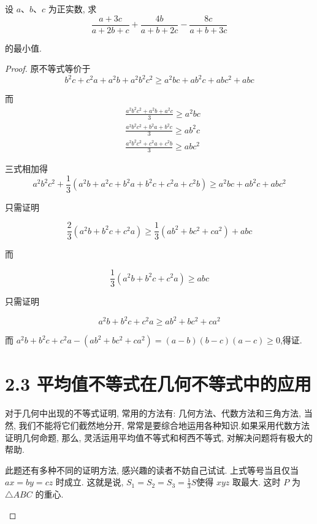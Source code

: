 \begin{example}
	设 $a 、 b 、 c$ 为正实数, 求
	$$
	\frac{a+3 c}{a+2 b+c}+\frac{4 b}{a+b+2 c}-\frac{8 c}{a+b+3 c}
	$$
	
	的最小值.
\end{example}
\begin{proof}
	原不等式等价于
	$$
	b^{2} c+c^{2} a+a^{2} b+a^{2} b^{2} c^{2} \geqslant a^{2} b c+a b^{2} c+a b c^{2}+a b c
	$$
	
	而
	$$
	\begin{aligned}
	& \frac{a^{2} b^{2} c^{2}+a^{2} b+a^{2} c}{3} \geqslant a^{2} b c \\
	& \frac{a^{2} b^{2} c^{2}+b^{2} a+b^{2} c}{3} \geqslant a b^{2} c \\
	& \frac{a^{2} b^{2} c^{2}+c^{2} a+c^{2} b}{3} \geqslant a b c^{2}
	\end{aligned}
	$$
	
	三式相加得
	$$
	a^{2} b^{2} c^{2}+\frac{1}{3}\left(a^{2} b+a^{2} c+b^{2} a+b^{2} c+c^{2} a+c^{2} b\right) \geqslant a^{2} b c+a b^{2} c+a b c^{2}
	$$
	
	只需证明
	
	$$
	\frac{2}{3}\left(a^{2} b+b^{2} c+c^{2} a\right) \geqslant \frac{1}{3}\left(a b^{2}+b c^{2}+c a^{2}\right)+a b c
	$$
	
	而
	
	$$
	\frac{1}{3}\left(a^{2} b+b^{2} c+c^{2} a\right) \geqslant a b c
	$$
	
	只需证明
	
	$$
	a^{2} b+b^{2} c+c^{2} a \geqslant a b^{2}+b c^{2}+c a^{2}
	$$
	
	而 $a^{2} b+b^{2} c+c^{2} a-\left(a b^{2}+b c^{2}+c a^{2}\right)=(a-b)(b-c)(a-c) \geqslant 0$,得证.
	

	\section*{2.3 平均值不等式在几何不等式中的应用}
	对于几何中出现的不等式证明, 常用的方法有: 几何方法、代数方法和三角方法, 当然, 我们不能将它们截然地分开, 常常是要综合地运用各种知识.如果采用代数方法证明几何命题, 那么, 灵活运用平均值不等式和柯西不等式, 对解决问题将有极大的帮助.

\begin{note}
	此题还有多种不同的证明方法, 感兴趣的读者不妨自己试试.
	上式等号当且仅当 $a x=b y=c z$ 时成立. 这就是说, $S_{1}=S_{2}=S_{3}=\frac{1}{3} S$使得 $x y z$ 取最大. 这时 $P$ 为 $\triangle A B C$ 的重心.
\end{note}


\end{proof}
